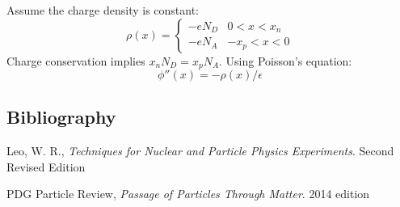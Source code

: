 \documentclass[11pt]{article}
\begin{document}
\noindent Assume the charge density is constant:
\begin{equation}
  \rho(x) = \begin{cases} - eN_D & 0 < x < x_n \\ - eN_A & -x_p < x < 0 \end{cases}
\end{equation}
Charge conservation implies $x_n N_D = x_p N_A$.  Using Poisson's equation:
\begin{equation}
  \phi''(x) = -\rho(x)/\epsilon
\end{equation}

\begin{appendices}
\section{Bibliography}

Leo, W. R., \emph{Techniques for Nuclear and Particle Physics Experiments}. Second Revised Edition
\vspace{5mm}

\noindent PDG Particle Review, \emph{Passage of Particles Through Matter}. 2014 edition

\end{appendices}
\end{document}
